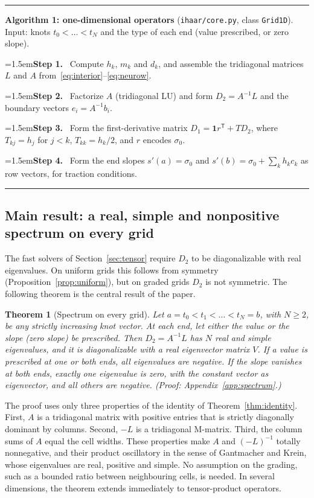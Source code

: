\documentclass[preprint,12pt]{elsarticle}
\newtheorem{theorem}{Theorem}
\theoremstyle{remark}
\newcommand{\proofin}[1]{\hfill{\small\emph{(Proof: Appendix~\ref{#1}.)}}}
\newcommand{\step}[1]{\par\noindent\hangindent=1.5em\hangafter=1\textbf{Step #1.}\ }
\begin{document}
\begin{algorithm}[t]\small\hrule\smallskip
\noindent\textbf{Algorithm 1: one-dimensional operators} (\texttt{ihaar/core.py}, class \texttt{Grid1D}).
Input: knots $t_0<\dots<t_N$ and the type of each end (value prescribed, or zero slope).
\step{1} Compute $h_k$, $m_k$ and $d_k$, and assemble the tridiagonal matrices $L$ and $A$ from~\eqref{eq:interior}--\eqref{eq:neurow}.
\step{2} Factorize $A$ (tridiagonal LU) and form $D_2=A^{-1}L$ and the boundary vectors $e_i=A^{-1}b_i$.
\step{3} Form the first-derivative matrix $D_1=\mathbf 1r^{\mathsf T}+TD_2$, where $T_{kj}=h_j$ for $j<k$, $T_{kk}=h_k/2$, and $r$ encodes $\sigma_0$.
\step{4} Form the end slopes $s'(a)=\sigma_0$ and $s'(b)=\sigma_0+\sum_kh_kc_k$ as row vectors, for traction conditions.
\smallskip\hrule
\end{algorithm}

\subsection{Main result: a real, simple and nonpositive spectrum on every grid}
The fast solvers of Section~\ref{sec:tensor} require $D_2$ to be diagonalizable with real eigenvalues.
On uniform grids this follows from symmetry (Proposition~\ref{prop:uniform}), but on graded grids $D_2$
is not symmetric. The following theorem is the central result of the paper.

\begin{theorem}[Spectrum on every grid]\label{thm:spectrum}
Let $a=t_0<t_1<\dots<t_N=b$, with $N\ge2$, be any strictly increasing knot vector. At each end, let
either the value or the slope (zero slope) be prescribed. Then $D_2=A^{-1}L$ has $N$ real and simple
eigenvalues, and it is diagonalizable with a real eigenvector matrix $V$. If a value is prescribed at
one or both ends, all eigenvalues are negative. If the slope vanishes at both ends, exactly one
eigenvalue is zero, with the constant vector as eigenvector, and all others are negative.
\proofin{app:spectrum}
\end{theorem}

The proof uses only three properties of the identity of Theorem~\ref{thm:identity}. First, $A$ is a
tridiagonal matrix with positive entries that is strictly diagonally dominant by columns. Second,
$-L$ is a tridiagonal M-matrix. Third, the column sums of $A$ equal the cell widths. These properties
make $A$ and $(-L)^{-1}$ totally nonnegative, and their product oscillatory in the sense of Gantmacher
and Krein, whose eigenvalues are real, positive and simple. No assumption on the grading, such as a
bounded ratio between neighbouring cells, is needed. In several dimensions, the theorem extends
immediately to tensor-product operators.
\end{document}
